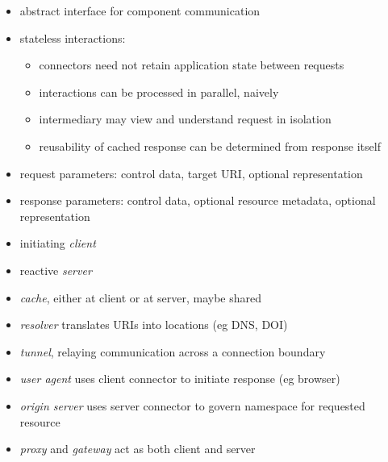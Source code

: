 \documentclass{sepslide-soa-faked} %
\begin{document}
\begin{slide}
\begin{itemize}
\item abstract interface for component communication
\item stateless interactions:
\begin{itemize}
\item connectors need not retain application state between requests
\item interactions can be processed in parallel, naively
\item intermediary may view and understand request in isolation
\item reusability of cached response can be determined from response itself
\end{itemize}
\item request parameters: control data, target URI, optional representation
\item response parameters: control data, optional resource metadata, optional representation
\end{itemize}
\end{slide}

\begin{slide}
\begin{itemize}
\item initiating \emph{client}
\item reactive \emph{server}
\item \emph{cache}, either at client or at server, maybe shared
\item \emph{resolver} translates URIs into locations (eg DNS, DOI)
\item \emph{tunnel}, relaying communication across a connection boundary
\end{itemize}
\end{slide}

\begin{slide}
\begin{itemize}
\item \emph{user agent} uses client connector to initiate response (eg browser)
\item \emph{origin server} uses server connector to govern namespace for requested resource
\item \emph{proxy} and \emph{gateway} act as both client and server
\end{itemize}
\end{slide}
\end{document}
